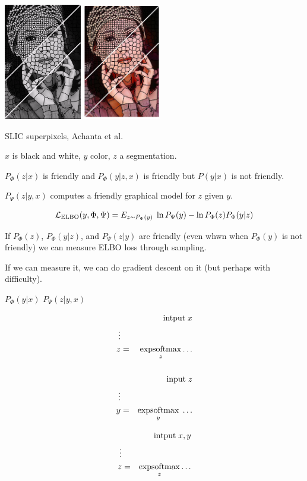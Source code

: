 {\centerline{\includegraphics[height = 2in]{../images/SLIC} \hspace{.5in} \includegraphics[height = 2in]{../images/SLICcolor}}
\centerline{\huge SLIC superpixels, Achanta et al.}

$x$ is black and white, $y$ color, $z$ a segmentation.

\vfill
$P_\Phi(z|x)$ is friendly and $P_\Phi(y|z,x)$ is friendly but $P(y|x)$ is not friendly.

\vfill
$P_\Psi(z|y,x)$ computes a friendly graphical model for $z$ given $y$.


\vfill
$${\cal L}_{\mathrm{ELBO}}(y,\Phi,\Psi)  = E_{z\sim P_\Psi(y)} \; \ln P_\Psi(y) - \ln P_\Phi(z)P_\Phi(y|z)$$

\vfill
If $P_\Phi(z)$, $P_\Phi(y|z)$, and $P_\Psi(z|y)$ are friendly (even whwn when $P_\Phi(y)$ is not friendly) we can
measure ELBO loss through sampling.

\vfill
If we can measure it, we can do gradient descent on it (but perhaps with difficulty).

\centerline{$P_\Phi(y|x)$ \hspace{10em} $P_\Psi(z|y,x)$}

\parbox{3.5in}{
\begin{eqnarray*}
& & \mbox{intput}\; x \\
\vdots \\
z & = & \operatorname*{expsoftmax}_z \ldots \\
\\
& & \mbox{input}\; z \\
\vdots \\
y & = & \operatorname*{expsoftmax}_y\;\ldots
\end{eqnarray*}
}
\hfill
\parbox{3.5in}{
\begin{eqnarray*}
& & \mbox{intput}\; x,y \\
\vdots \\
z & = & \operatorname*{expsoftmax}_z \ldots \\
\end{eqnarray*}
}

}
